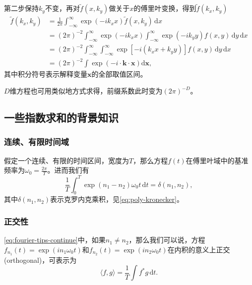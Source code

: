 第二步保持$k_{y}$不变，再对$\tilde{f} \left( x,k_{y} \right)$做关于$x$的傅里叶变换，得到$\tilde{f} \left( k_{x} ,k_{y} \right)$
\begin{equation*}
\begin{split}
  \widetilde{f} \left( k_{x}, k_{y} \right)
  & = \frac{1}{2 \pi} \int_{-\infty}^{\infty} \exp \left( - i k_{x} x \right) \tilde{f} \left( x , k_{y} \right) \, \mathrm{d} x \\
  & = \left( 2 \pi \right)^{-2}
  \int_{-\infty}^{\infty}
  \exp \left( - i k_{x} x \right)
  \int_{-\infty}^{\infty}
  \exp \left( - i k_{y} y \right)
  f \left( x, y \right)
  \, \mathrm{d} y
  \, \mathrm{d} x \\
  & = \left( 2 \pi \right)^{-2}
  \int_{-\infty}^{\infty}
  \int_{-\infty}^{\infty}
  \exp \left[ - i \left( k_{x} x + k_{y} y \right) \right]
  f \left( x, y \right)
  \, \mathrm{d} y
  \, \mathrm{d} x \\
  & = \left( 2 \pi \right)^{-2}
  \int \exp \left( - i \cdot \bm{k} \cdot \bm{x} \right)
  \mathrm{d} \bm{x},
\end{split}
\end{equation*}
其中积分符号表示解释变量$\bm{x}$的全部取值区间。

$D$维方程也可用类似地方式求得，前缀系数此时变为$\left( 2 \pi \right)^{- D}$。

\subsection{一些指数求和的背景知识}
\label{sec:fourier-expo-sums}

\subsubsection{连续、有限时间域}
假定一个连续、有限的时间区间，宽度为$T$，那么方程$f(t)$在傅里叶域中的基准频率为$\omega_{0} = \frac{2 \pi}{T}$。进而我们有
\begin{equation}
\label{eq:fourier-tips-continue}
\frac{1}{T} \int_{0}^{T} \exp \left( n_{1} - n_{2} \right) \omega_{0} t \, \mathrm{d} t = \delta \left(n_{1}, n_{2} \right),
\end{equation}
其中$\delta \left(n_{1}, n_{2} \right)$表示克罗内克乘积，见\eqref{eq:poly-kronecker}。

\subsubsection{正交性}
\label{eq:fourier-tips-orthogonal}
\eqref{eq:fourier-tips-continue}中，如果$n_{1} \neq n_{2}$，那么我们可以说，方程$f_{n_{1}}(t) = \exp \left( i n_{1} \omega_{0} t \right)$和$f_{n_{2}}(t) = \exp \left( i n_{2} \omega_{0} t \right)$在内积的意义上正交(orthogonal)，可表示为
\begin{equation*}
\langle f, g \rangle = \frac{1}{T} \int f^{*} g \, \mathrm{d} t.
\end{equation*}

